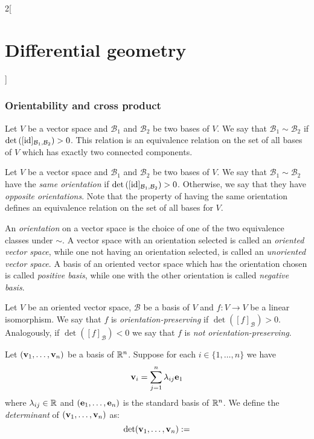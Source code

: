 \documentclass[../../../main.tex]{subfiles}
\begin{document}
\begin{multicols}{2}[\section{Differential geometry}]
  \subsubsection{Orientability and cross product}
  \begin{definition}
    Let $V$ be a vector space and $\mathcal{B}_1$ and $\mathcal{B}_2$ be two bases of $V$. We say that $\mathcal{B}_1\sim\mathcal{B}_2$ if $\det\left([\mathrm{id}]_{\mathcal{B}_1,\mathcal{B}_2}\right)>0$. This relation is an equivalence relation on the set of all bases of $V$ which has exactly two connected components.
  \end{definition}
  \begin{definition}
    Let $V$ be a vector space and $\mathcal{B}_1$ and $\mathcal{B}_2$ be two bases of $V$. We say that $\mathcal{B}_1\sim\mathcal{B}_2$ have the \emph{same orientation} if $\det\left([\mathrm{id}]_{\mathcal{B}_1,\mathcal{B}_2}\right)>0$. Otherwise, we say that they have \emph{opposite orientations}. Note that the property of having the same orientation defines an equivalence relation on the set of all bases for $V$.
  \end{definition}
  \begin{definition}
    An \emph{orientation} on a vector space is the choice of one of the two equivalence classes under $\sim$. A vector space with an orientation selected is called an \emph{oriented vector space}, while one not having an orientation selected, is called an \emph{unoriented vector space}. A basis of an oriented vector space which has the orientation chosen is called \emph{positive basis}, while one with the other orientation is called \emph{negative basis}.
  \end{definition}
  \begin{definition}
    Let $V$ be an oriented vector space, $\mathcal{B}$ be a basis of $V$ and $f:V\rightarrow V$ be a linear isomorphism. We say that $f$ is \emph{orientation-preserving} if $\det \left([f]_{\mathcal{B}}\right)>0$. Analogously, if $\det \left([f]_{\mathcal{B}}\right)<0$ we say that $f$ is \emph{not orientation-preserving}.
  \end{definition}
  \begin{definition}
    Let $(\boldsymbol{\mathrm{v}}_1,\ldots,\boldsymbol{\mathrm{v}}_n)$ be a basis of $\mathbb{R}^n$. Suppose for each $i\in\{1,\ldots,n\}$ we have $$\boldsymbol{\mathrm{v}}_i=\sum_{j=1}^n\lambda_{ij}\boldsymbol{\mathrm{e}}_1$$ where $\lambda_{ij}\in\mathbb{R}$ and $(\boldsymbol{\mathrm{e}}_1,\ldots,\boldsymbol{\mathrm{e}}_n)$ is the standard basis of $\mathbb{R}^n$. We define the \emph{determinant} of $(\boldsymbol{\mathrm{v}}_1,\ldots,\boldsymbol{\mathrm{v}}_n)$ as: $$\det(\boldsymbol{\mathrm{v}}_1,\ldots,\boldsymbol{\mathrm{v}}_n):=
$$
\end{definition}
\end{multicols}
\end{document}

